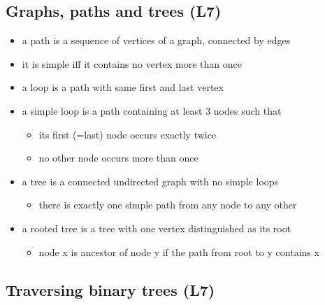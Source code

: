 \documentclass[
]{article}
\providecommand{\tightlist}{%
  \setlength{\itemsep}{0pt}\setlength{\parskip}{0pt}}
\begin{document}
\hypertarget{graphs-paths-and-trees-l7}{%
\subsection{Graphs, paths and trees
(L7)}\label{graphs-paths-and-trees-l7}}

\begin{itemize}
\tightlist
\item
  a path is a sequence of vertices of a graph, connected by edges
\item
  it is simple iff it contains no vertex more than once
\item
  a loop is a path with same first and last vertex
\item
  a simple loop is a path containing at least 3 nodes such that

  \begin{itemize}
  \tightlist
  \item
    its first (=last) node occurs exactly twice
  \item
    no other node occurs more than once
  \end{itemize}
\item
  a tree is a connected undirected graph with no simple loops

  \begin{itemize}
  \tightlist
  \item
    there is exactly one simple path from any node to any other
  \end{itemize}
\item
  a rooted tree is a tree with one vertex distinguished as its root

  \begin{itemize}
  \tightlist
  \item
    node x is ancestor of node y if the path from root to y contains x
  \end{itemize}
\end{itemize}

\hypertarget{traversing-binary-trees-l7}{%
\subsection{Traversing binary trees
(L7)}\label{traversing-binary-trees-l7}}
\end{document}
